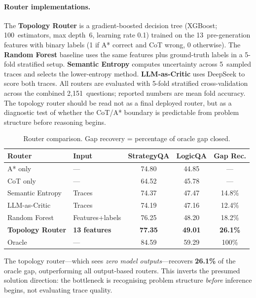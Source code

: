 \documentclass{article}
\begin{document}
\paragraph{Router implementations.}
The \textbf{Topology Router} is a gradient-boosted decision tree (XGBoost;
100~estimators, max depth~6, learning rate 0.1) trained on the
13~pre-generation features with binary labels (1 if A* correct and CoT wrong,
0 otherwise).  The \textbf{Random Forest} baseline uses the same features plus
ground-truth labels in a 5-fold stratified setup.  \textbf{Semantic Entropy}
computes uncertainty across 5~sampled traces and selects the lower-entropy
method.  \textbf{LLM-as-Critic} uses DeepSeek to score both traces.  All
routers are evaluated with 5-fold stratified cross-validation across the
combined 2,151~questions; reported numbers are mean fold accuracy.
The topology router should be read not as a final deployed router, but as a
diagnostic test of whether the CoT/A* boundary is predictable from problem
structure before reasoning begins.

\begin{table}[t]
\centering
\caption{Router comparison.  Gap recovery = percentage of oracle gap closed.}
\label{tab:router}
\small
\begin{tabular}{@{}llccc@{}}
\toprule
\textbf{Router} & \textbf{Input} & \textbf{StrategyQA} & \textbf{LogicQA}
  & \textbf{Gap Rec.} \\
\midrule
A* only         & ---              & 74.80 & 44.85 & --- \\
CoT only        & ---              & 64.52 & 45.78 & --- \\
\midrule
Semantic Entropy   & Traces           & 74.37 & 47.47 & 14.8\% \\
LLM-as-Critic      & Traces           & 74.19 & 47.16 & 12.4\% \\
Random Forest      & Features+labels  & 76.25 & 48.20 & 18.2\% \\
\textbf{Topology Router} & \textbf{13 features} & \textbf{77.35}
  & \textbf{49.01} & \textbf{26.1\%} \\
\midrule
Oracle & --- & 84.59 & 59.29 & 100\% \\
\bottomrule
\end{tabular}
\end{table}

The topology router---which sees \emph{zero model outputs}---recovers
\textbf{26.1\%} of the oracle gap, outperforming all output-based routers.
This inverts the presumed solution direction: the bottleneck is recognising
problem structure \emph{before} inference begins, not evaluating trace quality.
\end{document}
